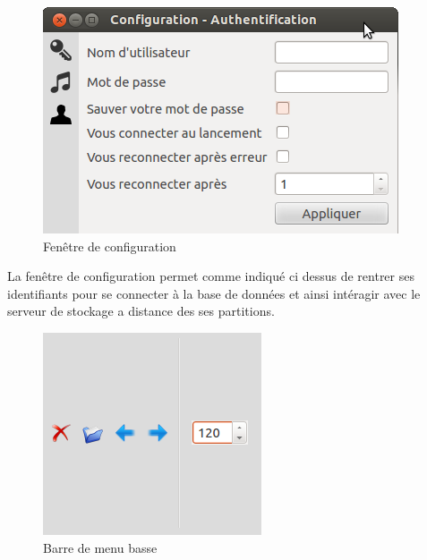 \begin{figure}[H]
\centering
\includegraphics[scale=0.5]{Config}
\caption{Fenêtre de configuration}
\end{figure}
La fenêtre de configuration permet comme indiqué ci dessus de rentrer ses identifiants pour se connecter à la base de données et ainsi 
intéragir avec le serveur de stockage a distance des ses partitions.

\begin{figure}[H]
\centering
\includegraphics[scale=0.5]{BotApp}
\caption{Barre de menu basse}
\end{figure}
